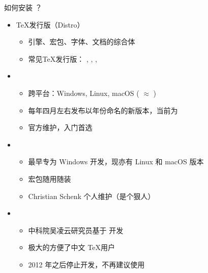 \begin{frame}{如何安装 ？}
  \begin{itemize}
    \item \TeX{}发行版（Distro）
      \begin{itemize}
        \item 引擎、宏包、字体、文档的综合体
        \item 常见\TeX{}发行版：
          \alert{\TL}, \MacTeX, \MiKTeX, \CTeX
      \end{itemize}
    \item \TL
      \begin{itemize}
        \item 跨平台：Windows, Linux, macOS (\MacTeX{} $\approx$ \TL)
        \item 每年四月左右发布以年份命名的新版本，当前为 
        \item 官方维护，入门首选
      \end{itemize}
    \item \MiKTeX
      \begin{itemize}
        \item 最早专为 Windows 开发，现亦有 Linux 和 macOS 版本
        \item 宏包随用随装
        \item Christian Schenk 个人维护（是个狠人）
      \end{itemize}
    \item \CTeX
      \begin{itemize}
        \item 中科院吴凌云研究员基于 \MiKTeX 开发
        \item 极大的方便了中文 \TeX 用户
        \item 2012 年之后停止开发，\alert{不再建议}使用
      \end{itemize}
  \end{itemize}
\end{frame}

